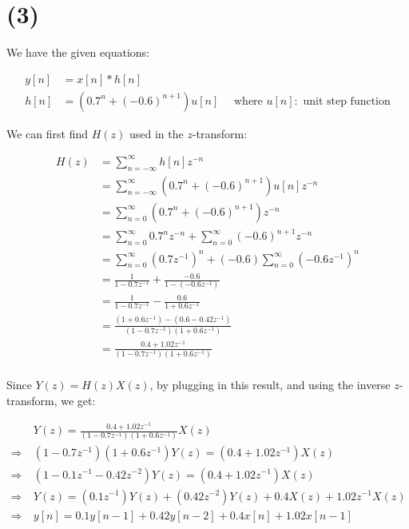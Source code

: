 \documentclass{article}
\begin{document}
\section*{(3)}

We have the given equations:

\begin{align*}
    y[n] &= x[n] * h[n] \\
    h[n] &= (0.7^n + (-0.6)^{n+1})u[n]  \quad \text{ where } u[n]: \text{ unit step function}
\end{align*}

We can first find $H(z)$ used in the $z$-transform:

\begin{align*}
    H(z) &= \sum_{n=-\infty}^{\infty} h[n]z^{-n} \\
    &= \sum_{n=-\infty}^{\infty} (0.7^n + (-0.6)^{n+1})u[n]z^{-n} \\
    &= \sum_{n=0}^{\infty} (0.7^n + (-0.6)^{n+1})z^{-n} \\
    &= \sum_{n=0}^{\infty} 0.7^nz^{-n} + \sum_{n=0}^{\infty} (-0.6)^{n+1}z^{-n} \\
    &= \sum_{n=0}^{\infty} (0.7 z^{-1})^n + (-0.6)\sum_{n=0}^{\infty} (-0.6 z^{-1})^n \\
    &= \frac{1}{1-0.7z^{-1}} + \frac{-0.6}{1-(-0.6z^{-1})} \\
    &= \frac{1}{1-0.7z^{-1}} - \frac{0.6}{1+0.6z^{-1}} \\
    &= \frac{(1+0.6z^{-1}) - (0.6 - 0.42z^{-1})}{(1-0.7z^{-1})(1+0.6z^{-1})} \\
    &= \frac{0.4 + 1.02z^{-1}}{(1-0.7z^{-1})(1+0.6z^{-1})} \\
\end{align*}

Since $Y(z) = H(z)X(z)$, by plugging in this result, and using the inverse $z$-transform, we get:

\begin{align*}
    &Y(z) = \frac{0.4 + 1.02z^{-1}}{(1-0.7z^{-1})(1+0.6z^{-1})}X(z) \\
    \Rightarrow \ &(1-0.7z^{-1})(1+0.6z^{-1})Y(z) = (0.4 + 1.02z^{-1})X(z) \\
    \Rightarrow \ & (1 - 0.1z^{-1} - 0.42z^{-2})Y(z) = (0.4 + 1.02z^{-1})X(z) \\
    \Rightarrow \ & Y(z) = (0.1z^{-1})Y(z) + (0.42z^{-2})Y(z) + 0.4X(z) + 1.02z^{-1}X(z) \\
    \Rightarrow \ &y[n] = 0.1y[n-1] + 0.42y[n-2] + 0.4x[n] + 1.02x[n-1] \qquad 
\end{align*}
\end{document}
